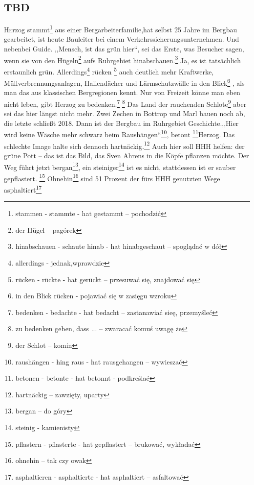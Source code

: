 \documentclass[twoside]{article}
\begin{document}
\begin{multicols}{2} %

\section{TBD}

\lettrine[nindent=0em,lines=3]{H}erzog stammt\footnote{stammen - stammte - hat
 gestammt -- pochodzi\'c} aus einer Bergarbeiterfamilie,hat selbst 25 Jahre im Bergbau gearbeitet, ist heute Bauleiter bei einem
 Verkehrssicherungsunternehmen. Und nebenbei Guide. ,,Mensch, ist das gr\"un hier``,
 sei das Erste, was Besucher sagen, wenn sie von den H\"ugeln\footnote {der H\"ugel -- pag\'{o}rek}
 aufs Ruhrgebiet hinabschauen.\footnote{hinabschauen - schaute hinab - hat hinabgeschaut -- spogl\k{a}da\'c w d\'{o}\l{}}
 Ja, es ist tats\"achlich erstaunlich gr\"un. Allerdings\footnote{allerdings - jednak,wprawdzie}
 r\"ucken \footnote{r\"ucken - r\"uckte - hat ger\"uckt -- przesuwa\'c si\k{e}, znajdowa\'c si\k{e}}
 auch deutlich mehr Kraftwerke, M\"ullverbrennungsanlagen, Hallend\"acher und L\"armschutzw\"alle
 in den Blick\footnote{in den Blick r\"ucken - pojawia\'c si\k{e} w zasi\k{e}gu wzroku} , als man das aus klassischen Bergregionen kennt. Nur von Freizeit
 k\"onne man eben nicht leben, gibt Herzog zu bedenken.\footnote{bedenken - bedachte - hat bedacht -- zastanawia\'c sie\k{e}, przemy\'sle\'c}
 \footnote{zu bedenken geben, dass ... -- zwaraca\'c komu\'s uwag\k{e} \.{z}e} Das Land der rauchenden Schlote\footnote{der Schlot -- komin}
 aber sei das hier l\"angst nicht mehr. Zwei Zechen in Bottrop und Marl bauen noch ab,
 die letzte schlie{\ss}t 2018. Dann ist der Bergbau im Ruhrgebiet Geschichte.,,Hier
 wird keine W\"asche mehr schwarz beim Raush\"angen``\footnote{raush\"angen - hing raus - hat rausgehangen -- wywiesza\'c}, betont
 \footnote{betonen - betonte - hat betonnt - podkre\'sla\'c}Herzog. Das schlechte
 Image halte sich dennoch hartn\"ackig.\footnote{hartn\"ackig -- zawzi\k{e}ty, uparty} Auch hier soll HHH helfen: der gr\"une Pott --
 das ist das Bild, das Sven Ahrens in die K\"opfe pflanzen m\"ochte. Der Weg f\"uhrt
 jetzt bergan\footnote{bergan -- do g\'ory}, ein steiniger\footnote{steinig - kamienisty} ist es nicht, stattdessen ist er sauber gepflastert.
 \footnote{pflastern - pflasterte - hat gepflastert -- brukowa\'c, wyk\l{}ada\'c}
 Ohnehin\footnote{ohnehin -- tak czy owak} sind 51 Prozent der f\"urs HHH genutzten Wege asphaltiert\footnote{asphaltieren - asphaltierte - hat asphaltiert -- asfaltowa\'c}

\end{multicols}
\end{document}
